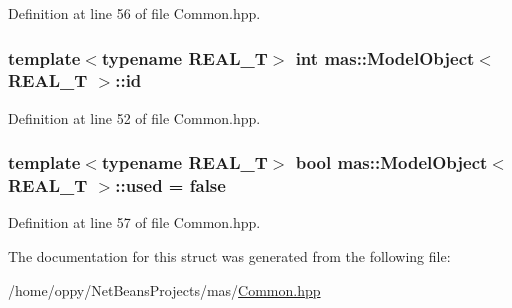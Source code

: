Definition at line 56 of file Common.\-hpp.

\hypertarget{structmas_1_1_model_object_a1455cdfd12f282766b0689f3a345dbb7}{
\subsubsection[{id}]{\setlength{\rightskip}{0pt plus 5cm}template$<$typename R\-E\-A\-L\-\_\-\-T$>$ int {\bf mas\-::\-Model\-Object}$<$ R\-E\-A\-L\-\_\-\-T $>$\-::id}}\label{structmas_1_1_model_object_a1455cdfd12f282766b0689f3a345dbb7}


Definition at line 52 of file Common.\-hpp.

\hypertarget{structmas_1_1_model_object_a47d30dfc08290aebd94cf3096d53ef6a}{
\subsubsection[{used}]{\setlength{\rightskip}{0pt plus 5cm}template$<$typename R\-E\-A\-L\-\_\-\-T$>$ bool {\bf mas\-::\-Model\-Object}$<$ R\-E\-A\-L\-\_\-\-T $>$\-::used = false}}\label{structmas_1_1_model_object_a47d30dfc08290aebd94cf3096d53ef6a}


Definition at line 57 of file Common.\-hpp.



The documentation for this struct was generated from the following file\-:\begin{DoxyCompactItemize}
\item 
/home/oppy/\-Net\-Beans\-Projects/mas/\hyperlink{_common_8hpp}{Common.\-hpp}\end{DoxyCompactItemize}

